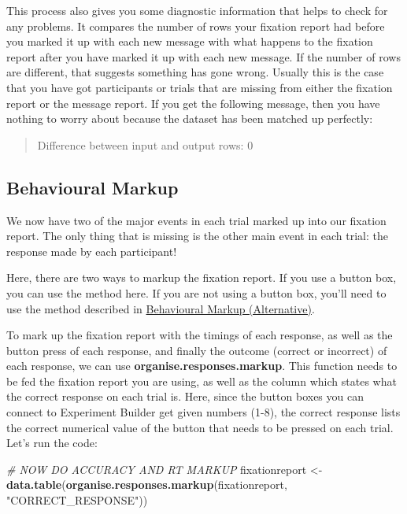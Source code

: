 \documentclass[]{book}
\newenvironment{Shaded}{\begin{snugshade}}{\end{snugshade}}
\newcommand{\CommentTok}[1]{\textcolor[rgb]{0.56,0.35,0.01}{\textit{#1}}}
\newcommand{\KeywordTok}[1]{\textcolor[rgb]{0.13,0.29,0.53}{\textbf{#1}}}
\newcommand{\NormalTok}[1]{#1}
\newcommand{\StringTok}[1]{\textcolor[rgb]{0.31,0.60,0.02}{#1}}
\begin{document}
This process also gives you some diagnostic information that helps to check for any problems. It compares the number of rows your fixation report had before you marked it up with each new message with what happens to the fixation report after you have marked it up with each new message. If the number of rows are different, that suggests something has gone wrong. Usually this is the case that you have got participants or trials that are missing from either the fixation report or the message report. If you get the following message, then you have nothing to worry about because the dataset has been matched up perfectly:

\begin{quote}
Difference between input and output rows: 0
\end{quote}

\hypertarget{behavioural-markup}{%
\subsection{Behavioural Markup}\label{behavioural-markup}}

We now have two of the major events in each trial marked up into our fixation report. The only thing that is missing is the other main event in each trial: the response made by each participant!

Here, there are two ways to markup the fixation report. If you use a button box, you can use the method here. If you are not using a button box, you'll need to use the method described in \protect\hyperlink{bma}{Behavioural Markup (Alternative)}.

To mark up the fixation report with the timings of each response, as well as the button press of each response, and finally the outcome (correct or incorrect) of each response, we can use \textbf{organise.responses.markup}. This function needs to be fed the fixation report you are using, as well as the column which states what the correct response on each trial is. Here, since the button boxes you can connect to Experiment Builder get given numbers (1-8), the correct response lists the correct numerical value of the button that needs to be pressed on each trial. Let's run the code:

\begin{Shaded}
\begin{Highlighting}[]
\CommentTok{# NOW DO ACCURACY AND RT MARKUP}
\NormalTok{fixationreport <-}\StringTok{ }\KeywordTok{data.table}\NormalTok{(}\KeywordTok{organise.responses.markup}\NormalTok{(fixationreport, }\StringTok{"CORRECT_RESPONSE"}\NormalTok{))}
\end{Highlighting}
\end{Shaded}
\end{document}
